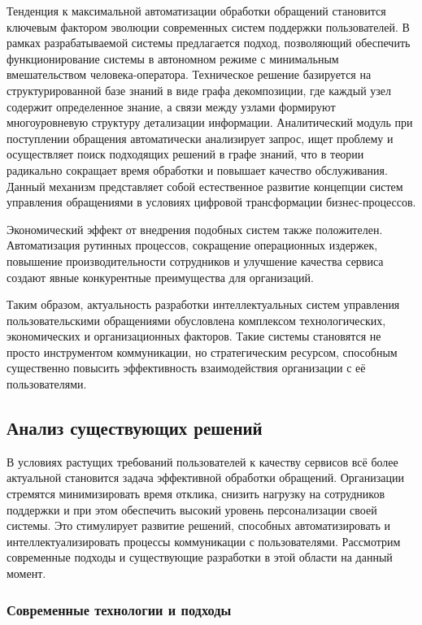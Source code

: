 Тенденция к максимальной автоматизации обработки обращений становится ключевым фактором эволюции современных систем поддержки пользователей. В рамках разрабатываемой системы предлагается подход, позволяющий обеспечить функционирование системы в автономном режиме с минимальным вмешательством человека-оператора. Техническое решение базируется на структурированной базе знаний в виде графа декомпозиции, где каждый узел содержит определенное знание, а связи между узлами формируют многоуровневую структуру детализации информации. Аналитический модуль при поступлении обращения автоматически анализирует запрос, ищет проблему и осуществляет поиск подходящих решений в графе знаний, что в теории радикально сокращает время обработки и повышает качество обслуживания. Данный механизм представляет собой естественное развитие концепции систем управления обращениями в условиях цифровой трансформации бизнес-процессов.

Экономический эффект от внедрения подобных систем также положителен. Автоматизация рутинных процессов, сокращение операционных издержек, повышение производительности сотрудников и улучшение качества сервиса создают явные конкурентные преимущества для организаций.

Таким образом, актуальность разработки интеллектуальных систем управления пользовательскими обращениями обусловлена комплексом технологических, экономических и организационных факторов. Такие системы становятся не просто инструментом коммуникации, но стратегическим ресурсом, способным существенно повысить эффективность взаимодействия организации с её пользователями.

\subsection{Анализ существующих решений}

В условиях растущих требований пользователей к качеству сервисов всё более актуальной становится задача эффективной обработки обращений. Организации стремятся минимизировать время отклика, снизить нагрузку на сотрудников поддержки и при этом обеспечить высокий уровень персонализации своей системы. Это стимулирует развитие решений, способных автоматизировать и интеллектуализировать процессы коммуникации с пользователями. Рассмотрим современные подходы и существующие разработки в этой области на данный момент.

\subsubsection{Современные технологии и подходы}

